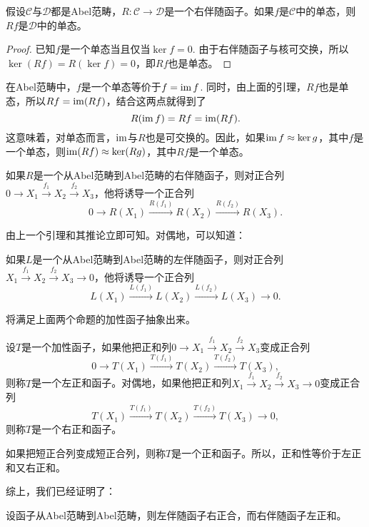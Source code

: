 \begin{lem}
假设$\mathcal{C}$与$\mathcal{D}$都是Abel范畴，$R:\mathcal{C}\to \mathcal{D}$是一个右伴随函子。如果$f$是$\mathcal{C}$中的单态，则$Rf$是$\mathcal{D}$中的单态。
\end{lem}

\begin{proof}
已知$f$是一个单态当且仅当$\ker f=0$. 由于右伴随函子与核可交换，所以$\ker(Rf)= R(\ker f)=0$，即$Rf$也是单态。
\end{proof}

在Abel范畴中，$f$是一个单态等价于$f=\operatorname{im} f$. 同时，由上面的引理，$Rf$也是单态，所以$Rf=\operatorname{im}(Rf)$，结合这两点就得到了
\[
	R(\operatorname{im} f)=Rf=\operatorname{im}(Rf).
\]
这意味着，对单态而言，$\operatorname{im}$与$R$也是可交换的。因此，如果$\operatorname{im} f\approx \ker g$，其中$f$是一个单态，则$\operatorname{im}(Rf)\approx \ker(Rg)$，其中$Rf$是一个单态。

\begin{pro}
如果$R$是一个从Abel范畴到Abel范畴的右伴随函子，则对正合列$0\to X_1\xrightarrow{f_1} X_2\xrightarrow{f_2} X_3$，他将诱导一个正合列
\[
	0\to R(X_1)\xrightarrow{R(f_1)} R(X_2)\xrightarrow{R(f_2)} R(X_3).
\]
\end{pro}

由上一个引理和其推论立即可知。对偶地，可以知道：

\begin{pro}
如果$L$是一个从Abel范畴到Abel范畴的左伴随函子，则对正合列$X_1\xrightarrow{f_1} X_2\xrightarrow{f_2} X_3 \to 0$，他将诱导一个正合列
\[
	L(X_1)\xrightarrow{L(f_1)} L(X_2)\xrightarrow{L(f_2)} L(X_3) \to 0.
\]
\end{pro}

将满足上面两个命题的加性函子抽象出来。

\begin{para}
设$T$是一个加性函子，如果他把正和列$0\to X_1\xrightarrow{f_1} X_2\xrightarrow{f_2} X_3$变成正合列
\[
	0\to T(X_1)\xrightarrow{T(f_1)} T(X_2)\xrightarrow{T(f_2)} T(X_3),
\]
则称$T$是一个左正和函子。对偶地，如果他把正和列$X_1\xrightarrow{f_1} X_2\xrightarrow{f_2} X_3\to 0$变成正合列
\[
	T(X_1)\xrightarrow{T(f_1)} T(X_2)\xrightarrow{T(f_2)} T(X_3)\to 0,
\]
则称$T$是一个右正和函子。

如果把短正合列变成短正合列，则称$T$是一个正和函子。所以，正和性等价于左正和又右正和。
\end{para}

综上，我们已经证明了：

\begin{thm}
设函子从Abel范畴到Abel范畴，则左伴随函子右正合，而右伴随函子左正和。
\end{thm}

